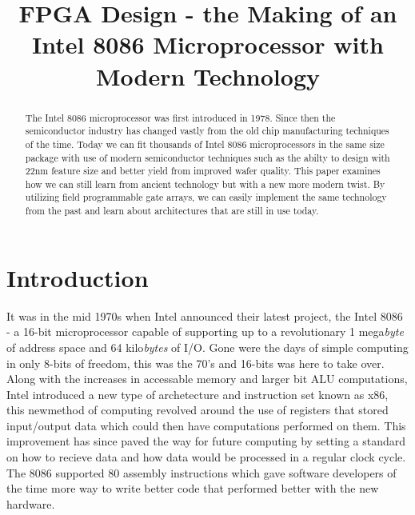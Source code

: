 \documentclass[conference]{IEEEtran}
\begin{document}
\title{FPGA Design - the Making of an Intel 8086 Microprocessor with Modern Technology}

\maketitle


\begin{abstract}
The Intel 8086 microprocessor was first introduced in 1978. Since then the semiconductor industry has changed vastly from the old chip manufacturing techniques of the time. Today we can fit thousands of Intel 8086 microprocessors in the same size package with use of modern semiconductor techniques such as the abilty to design with 22nm feature size and better yield from improved wafer quality. This paper examines how we can still learn from ancient technology but with a new more modern twist. By utilizing field programmable gate arrays, we can easily implement the same technology from the past and learn about architectures that are still in use today.
\end{abstract}

%
\IEEEpeerreviewmaketitle



\section{Introduction}
It was in the mid 1970s when Intel announced their latest project, the Intel 8086 -  a 16-bit microprocessor capable of supporting up to a revolutionary 1 mega{\em byte} of address space and 64 kilo{\em bytes} of I/O. Gone were the days of simple computing in only 8-bits of freedom, this was the 70's and 16-bits was here to take over. Along with the increases in accessable memory and larger bit ALU computations, Intel introduced a new type of archetecture and instruction set known as x86, this newmethod of computing revolved around the use of registers that stored input/output data which could then have computations performed on them. This improvement has since paved the way for future computing by setting a standard on how to recieve data and how data would be processed in a regular clock cycle. The 8086 supported 80 assembly instructions which gave software developers of the time more way to write better code that performed better with the new hardware.
\end{document}
